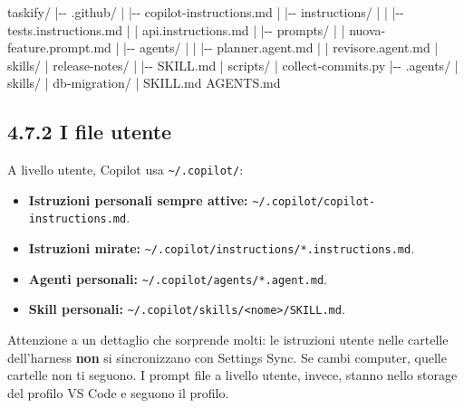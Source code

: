 \documentclass[
  italian,
  10pt,
]{book}
\newenvironment{Shaded}{\begin{snugshade}}{\end{snugshade}}
\newcommand{\NormalTok}[1]{#1}
\providecommand{\tightlist}{%
  \setlength{\itemsep}{0pt}\setlength{\parskip}{0pt}}
\begin{document}
\begin{Shaded}
\begin{Highlighting}[]
\NormalTok{taskify/}
\NormalTok{|{-}{-} .github/}
\NormalTok{|   |{-}{-} copilot{-}instructions.md}
\NormalTok{|   |{-}{-} instructions/}
\NormalTok{|   |   |{-}{-} tests.instructions.md}
\NormalTok{|   |   \textasciigrave{}{-}{-} api.instructions.md}
\NormalTok{|   |{-}{-} prompts/}
\NormalTok{|   |   \textasciigrave{}{-}{-} nuova{-}feature.prompt.md}
\NormalTok{|   |{-}{-} agents/}
\NormalTok{|   |   |{-}{-} planner.agent.md}
\NormalTok{|   |   \textasciigrave{}{-}{-} revisore.agent.md}
\NormalTok{|   \textasciigrave{}{-}{-} skills/}
\NormalTok{|       \textasciigrave{}{-}{-} release{-}notes/}
\NormalTok{|           |{-}{-} SKILL.md}
\NormalTok{|           \textasciigrave{}{-}{-} scripts/}
\NormalTok{|               \textasciigrave{}{-}{-} collect{-}commits.py}
\NormalTok{|{-}{-} .agents/}
\NormalTok{|   \textasciigrave{}{-}{-} skills/}
\NormalTok{|       \textasciigrave{}{-}{-} db{-}migration/}
\NormalTok{|           \textasciigrave{}{-}{-} SKILL.md}
\NormalTok{\textasciigrave{}{-}{-} AGENTS.md}
\end{Highlighting}
\end{Shaded}

\subsection{4.7.2 I file utente}\label{i-file-utente}

A livello utente, Copilot usa \texttt{\textasciitilde{}/.copilot/}:

\begin{itemize}
\tightlist
\item
  \textbf{Istruzioni personali sempre attive:}
  \texttt{\textasciitilde{}/.copilot/copilot-instructions.md}.
\item
  \textbf{Istruzioni mirate:}
  \texttt{\textasciitilde{}/.copilot/instructions/*.instructions.md}.
\item
  \textbf{Agenti personali:}
  \texttt{\textasciitilde{}/.copilot/agents/*.agent.md}.
\item
  \textbf{Skill personali:}
  \texttt{\textasciitilde{}/.copilot/skills/\textless{}nome\textgreater{}/SKILL.md}.
\end{itemize}

Attenzione a un dettaglio che sorprende molti: le istruzioni utente
nelle cartelle dell'harness \textbf{non} si sincronizzano con Settings
Sync. Se cambi computer, quelle cartelle non ti seguono. I prompt file a
livello utente, invece, stanno nello storage del profilo VS Code e
seguono il profilo.
\end{document}
